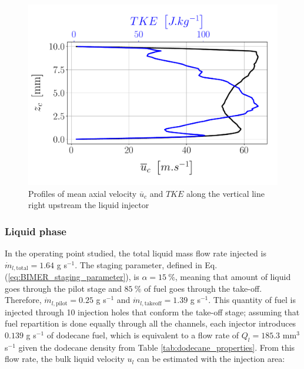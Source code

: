 \begin{figure}[ht]
\centering
	\centering
   \includegraphics[scale=0.4]{./part3_applications/figures_ch8_resolved/gas_inlet_profiles}
   \vspace*{-0.15in}
   \caption{Profiles of mean axial velocity $\overline{u}_c$ and $TKE$ along the vertical line right upstream the liquid injector}
\label{fig:BIMER_gas_inlet_profiles}
\end{figure}




\subsubsection*{Liquid phase}

In the operating point studied, the total liquid mass flow rate injected is $\dot{m}_{l,\mathrm{total}} = 1.64$ g s$^{-1}$. The staging parameter, defined in Eq. (\ref{eq:BIMER_staging_parameter}), is $\alpha = 15 ~\%$, meaning that amount of liquid goes through the pilot stage and $85 ~\%$ of fuel goes through the take-off. Therefore, $\dot{m}_{l,\mathrm{pilot}} = 0.25$ g s$^{-1}$ and $\dot{m}_{l,\mathrm{takeoff}} = 1.39$ g s$^{-1}$. This quantity of fuel is injected through 10 injection holes that conform the take-off stage; assuming that fuel repartition is done equally through all the channels, each injector introduces $0.139$ g s$^{-1}$ of dodecane fuel, which is equivalent to a flow rate of $Q_l = 185.3$  mm$^3$ s$^{-1}$ given the dodecane density from Table \ref{tab:dodecane_properties}. From this flow rate, the bulk liquid velocity $u_l$ can be estimated with the injection area:


